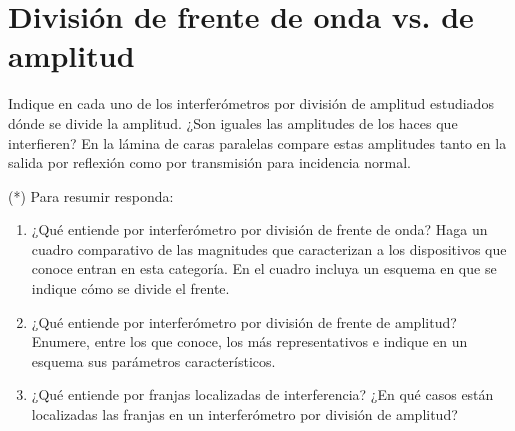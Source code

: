\section*{División de frente de onda vs. de amplitud}

\item Indique en cada uno de los interferómetros por división de amplitud estudiados dónde se divide la amplitud.
¿Son iguales las amplitudes de los haces que interfieren?
En la lámina de caras paralelas compare estas amplitudes tanto en la salida por reflexión como por transmisión para incidencia normal.



\item (*) Para resumir responda:
\begin{enumerate}
	\item ¿Qué entiende por interferómetro por división de frente de onda?
	Haga un cuadro comparativo de las magnitudes que caracterizan a los dispositivos que conoce entran en esta categoría.
	En el cuadro incluya un esquema en que se indique cómo se divide el frente.
	\item ¿Qué entiende por interferómetro por división de frente de amplitud?
	Enumere, entre los que conoce, los más representativos e indique en un esquema sus parámetros característicos. 
	\item ¿Qué entiende por franjas localizadas de interferencia?
	¿En qué casos están localizadas las franjas en un interferómetro por división de amplitud?
\end{enumerate}
